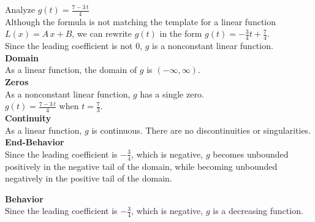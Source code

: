 \documentclass{ximera}
\begin{document}
\begin{example}

Analyze $g(t) = \frac{7 - 3 \, t}{4}$  \\


Although the formula is not matching the template for a linear function $L(x) = A \, x + B$, we can rewrite $g(t)$ in the form $g(t) = -\frac{3}{4} t + \frac{7}{4}$. \\

Since the leading coefficient is not $0$, $g$ is a nonconstant linear function.\\



\textbf{Domain} \\

As a linear function, the domain of $g$ is $(-\infty, \infty)$.\\


\textbf{Zeros} \\

As a nonconstant linear function, $g$ has a single zero.\\

$g(t) = \frac{7 - 3 \, t}{4}$ when $t = \frac{7}{3}$. \\


\textbf{Continuity} \\

As a linear function, $g$ is continuous.  There are no discontinuities or singularities. \\



\textbf{End-Behavior} \\

Since the leading coefficient is $-\frac{3}{4}$, which is negative, $g$ becomes unbounded positively in the negative tail of the domain, while becoming unbounded negatively in the positive tail of the domain.




\textbf{Behavior} \\

Since the leading coefficient is $-\frac{3}{4}$, which is negative, $g$ is a decreasing function. \\




\end{example}
\end{document}
